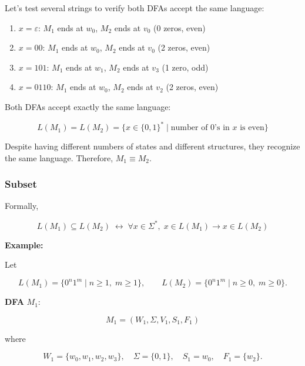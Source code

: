 \documentclass[12pt,a4paper,openany]{article}
\begin{document}
Let's test several strings to verify both DFAs accept the same language:

\begin{enumerate}
    \item $x = \varepsilon$: $M_1$ ends at $w_0$, $M_2$ ends at $v_0$  (0 zeros, even)
    \item $x = 00$: $M_1$ ends at $w_0$, $M_2$ ends at $v_0$  (2 zeros, even)
    \item $x = 101$: $M_1$ ends at $w_1$, $M_2$ ends at $v_3$  (1 zero, odd)
    \item $x = 0110$: $M_1$ ends at $w_0$, $M_2$ ends at $v_2$  (2 zeros, even)
\end{enumerate}

Both DFAs accept exactly the same language:

\[
L(M_1) = L(M_2) =
\{x \in \{0,1\}^* \mid \text{number of } 0\text{'s in } x \text{ is even}\}
\]

Despite having different numbers of states and different structures, they recognize the same language. Therefore, $M_1 \equiv M_2$.

\subsubsection{Subset}

Formally,

\[
L(M_1) \subseteq L(M_2)
\;\leftrightarrow\;
\forall x \in \Sigma^*,\; x \in L(M_1) \to x \in L(M_2)
\]

\textbf{Example:}

Let

\[
L(M_1) = \{0^n1^m \mid n \ge 1,\; m \ge 1\}, \qquad
L(M_2) = \{0^n1^m \mid n \ge 0,\; m \ge 0\}.
\]

\textbf{DFA} $M_1$:

\[
M_1 = (W_1,\Sigma,V_1,S_1,F_1)
\]

where

\[
W_1 = \{w_0,w_1,w_2,w_3\},\quad
\Sigma = \{0,1\},\quad
S_1 = w_0,\quad
F_1 = \{w_2\}.
\]

\begin{center}
\end{center}
\end{document}
